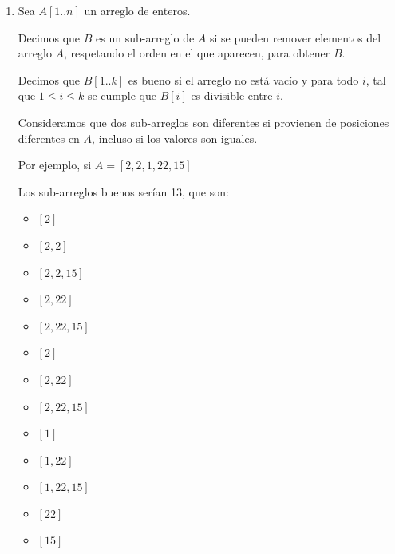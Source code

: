 \documentclass[letterpaper, 12pt]{article}
\begin{document}
\begin{enumerate}
La tabla resultante se puede interpretar como que la distancia de edición entre \texttt{christopher} y \texttt{gomez} es 9, y se logra eliminando \texttt{chris}, intercambiando la \texttt{t} por una \texttt{g}, eliminando la \texttt{p} luego de la \texttt{o} e intercambiando la \texttt{h} y la \texttt{r} por una \texttt{m} y una \texttt{z} respectivamente. Esto es:

\begin{itemize}
    \item \texttt{christopher} $\rightarrow$ \texttt{topher} (5 eliminaciones).
    \item \texttt{topher} $\rightarrow$ \texttt{gopher} (1 reemplazo).
    \item \texttt{gopher} $\rightarrow$ \texttt{goher} (1 eliminación).
    \item \texttt{goher} $\rightarrow$ \texttt{gomez} (2 reemplazos).
\end{itemize}

\newpage

\item Sea $A[1..n]$ un arreglo de enteros.

Decimos que $B$ es un sub-arreglo de $A$ si se pueden remover elementos del arreglo $A$,
respetando el orden en el que aparecen, para obtener $B$.

Decimos que $B[1..k]$ es bueno si el arreglo no está vacío y para todo $i$, tal que $1 \leq i \leq k$ se
cumple que $B[i]$ es divisible entre $i$.

Consideramos que dos sub-arreglos son diferentes si provienen de posiciones diferentes en $A$, incluso si los valores son iguales.

Por ejemplo, si $A = [2, 2, 1, 22, 15]$

Los sub-arreglos buenos serían 13, que son:

\begin{multicols}{5}
    \begin{itemize}
        \item $[2]$
        \item $[2, 2]$
        \item $[2, 2, 15]$
        \item $[2, 22]$
        \item $[2, 22, 15]$
        \item $[2]$
        \item $[2, 22]$
        \item $[2, 22, 15]$
        \item $[1]$
        \item $[1, 22]$
        \item $[1, 22, 15]$
        \item $[22]$
        \item $[15]$
    \end{itemize}
\end{multicols}


\end{enumerate}
\end{document}
